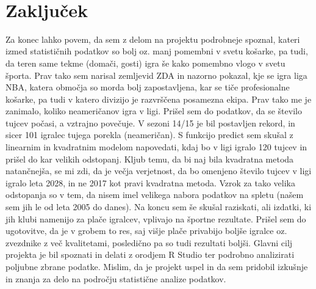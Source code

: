\documentclass[11pt,a4paper]{article}
\begin{document}
\\
\section{Zaključek}
Za konec lahko povem, da sem z delom na projektu podrobneje spoznal, kateri izmed statističnih podatkov so bolj oz. manj pomembni v svetu košarke, pa tudi, da teren same tekme (domači, gosti) igra še kako pomembno vlogo v svetu športa. Prav tako sem narisal zemljevid ZDA in nazorno pokazal, kje se igra liga NBA, katera območja so morda bolj zapostavljena, kar se tiče profesionalne košarke, pa tudi v katero divizijo je razvrščena posamezna ekipa. Prav tako me je zanimalo, koliko neameričanov igra v ligi. Prišel sem do podatkov, da se število tujcev počasi, a vztrajno povečuje. V sezoni 14/15 je bil postavljen rekord, in sicer 101 igralec tujega porekla (neameričan). S funkcijo predict sem skušal z linearnim in kvadratnim modelom napovedati, kdaj bo v ligi igralo 120 tujcev in prišel do kar velikih odstopanj. Kljub temu, da bi naj bila kvadratna metoda natančnejša, se mi zdi, da je večja verjetnost, da bo omenjeno število tujcev v ligi igralo leta 2028, in ne 2017 kot pravi kvadratna metoda. Vzrok za tako velika odstopanja so v tem, da nisem imel velikega nabora podatkov na spletu (našem sem jih le od leta 2005 do danes). Na koncu sem še skušal raziskati, ali izdatki, ki jih klubi namenijo za plače igralcev, vplivajo na športne rezultate. Prišel sem do ugotovitve, da je v grobem to res, saj višje plače privabijo boljše igralce oz. zvezdnike z več kvalitetami, posledično pa so tudi rezultati boljši. Glavni cilj projekta je bil spoznati in delati z orodjem R Studio ter podrobno analizirati poljubne zbrane podatke. Mislim, da je projekt uspel in da sem pridobil izkušnje in znanja za delo na področju statistične analize podatkov.

\newpage
\begin{thebibliography}{9}
  \url{http://sportslistoftheday.com/2013/12/15/nba-2013-14-team-payrolls-and-salary-cap-hits/}\\
  {Accessed: 01-03-2015}
  \url{http://en.wikipedia.org/wiki/List_of_Olympic_Games_host_cities}\\
  {Accessed: 01-03-2015}
  \url{http://stats.nba.com/league/team/#!/?Season=2013-14}\\
  {{Accessed: 01-03-2015}
  \url{http://stats.nba.com/league/team/#!/?Season=2013-14&Location=Road}\\
  {Accessed: 01-03-2015}
  \url{http://stats.nba.com/team/#!/1610612756/players/?Season=2013-14}\\
  {Accessed: 01-03-2015}
  \url{http://www.infoplease.com/ipa/A0001796.html}\\
  {Accessed: 01-03-2015}
  \url{http://gadm.org/download}\\
  {Accessed: 01-03-2015}
  \url{http://en.wikipedia.org/wiki/List_of_foreign_NBA_players}\\
  {Accessed: 01-03-2015}
  \url{http://en.wikipedia.org/wiki/National_Basketball_Association}\\
  {Accessed: 01-03-2015}
\end{thebibliography}
\end{document}
